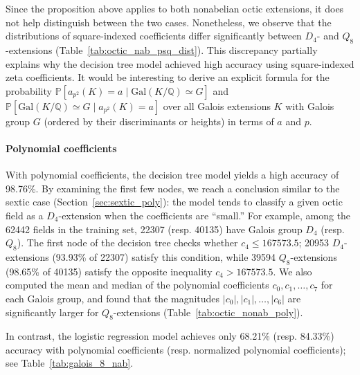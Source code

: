 \documentclass[letterpaper, 10pt]{article}
\newcommand{\Gal}{\mathrm{Gal}}
\newcommand{\1}{\mathds{1}}	%
\theoremstyle{definition}
\theoremstyle{remark}
\begin{document}
Since the proposition above applies to both nonabelian octic extensions, it does not help distinguish between the two cases. Nonetheless, we observe that the distributions of square-indexed coefficients differ significantly between \( D_4 \)- and \( Q_8 \)-extensions (Table~\ref{tab:octic_nab_psq_dist}). This discrepancy partially explains why the decision tree model achieved high accuracy using square-indexed zeta coefficients. It would be interesting to derive an explicit formula for the probability \( \mathbb{P}[a_{p^2}(K) = a \mid \Gal(K / \mathbb{Q}) \simeq G] \) and \( \mathbb{P}[\Gal(K / \mathbb{Q}) \simeq G \mid a_{p^2}(K) = a]\)  over all Galois extensions $K$ with Galois group $G$ (ordered by their discriminants or heights) in terms of $a$ and $p$.



\paragraph{Polynomial coefficients}

With polynomial coefficients, the decision tree model yields a high accuracy of  98.76\%. By examining the first few nodes, we reach a conclusion similar to the sextic case (Section~\ref{sec:sextic_poly}): the model tends to classify a given octic field as a \( D_4 \)-extension when the coefficients are ``small.''
For example, among the \num{62442} fields in the training set, \num{22307} (resp. \num{40135}) have Galois group \( D_4 \) (resp. \( Q_8 \)). The first node of the decision tree checks whether \( c_4 \le \num{167573.5} \); \num{20953} \( D_4 \)-extensions (93.93\% of \num{22307}) satisfy this condition, while \num{39594} \( Q_8 \)-extensions (98.65\% of \num{40135}) satisfy the opposite inequality \( c_4 > \num{167573.5} \).
We also computed the mean and median of the polynomial coefficients \( c_0, c_1, \dots, c_7 \) for each Galois group, and found that the magnitudes \( |c_0|, |c_1|, \dots, |c_6| \) are significantly larger for \( Q_8 \)-extensions (Table~\ref{tab:octic_nonab_poly}).

In contrast, the logistic regression model achieves only  68.21\% (resp. 84.33\%) accuracy with polynomial coefficients (resp. normalized polynomial coefficients); see Table~\ref{tab:galois_8_nab}.
\end{document}

